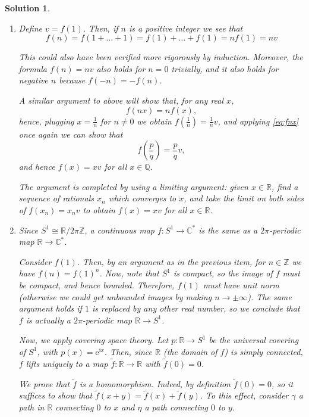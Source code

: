 \documentclass{article}
\theoremstyle{nonumberplain}
\newtheorem{sol}{Solution}
\newcommand{\R}{\mathbb{R}}
\newcommand{\C}{\mathbb{C}}
\newcommand{\Z}{\mathbb{Z}}
\newcommand{\Q}{\mathbb{Q}}
\newcommand{\I}{\mathrm{i}}
\newcommand{\e}{\mathrm{e}}
\begin{document}
\begin{sol}
\leavevmode
\begin{enumerate}
\item Define $v = f(1)$. Then, if $n$ is a positive integer we see that
\begin{equation}
f(n) = f(1+\dots+1) = f(1)+\dots+f(1) = n f(1) = nv
\end{equation}

This could also have been verified more rigorously by induction. Moreover, the formula $f(n) = nv$ also holds for $n = 0$ trivially, and it also holds for negative $n$ because $f(-n) = -f(n)$.

A similar argument to above will show that, for any real $x$,
\begin{equation}\label{eq:fnx}
f(nx) = n f(x),
\end{equation}
hence, plugging $x = \frac1n$ for $n \neq 0$ we obtain $f(\frac1n) = \frac1n v$, and applying \eqref{eq:fnx} once again we can show that
\begin{equation}
f(\frac pq) = \frac pq v,
\end{equation}
and hence $f(x) = x v$ for all $x \in \Q$.

The argument is completed by using a limiting argument: given $x \in \R$, find a sequence of rationals $x_n$ which converges to $x$, and take the limit on both sides of $f(x_n) = x_n v$ to obtain $f(x) = x v$ for all $x \in \R$.

\item Since $S^1 \cong \R / 2\pi\Z$, a continuous map $f \colon S^1 \to \C^*$ is the same as a $2\pi$-periodic map $\R \to \C^*$.

Consider $f(1)$. Then, by an argument as in the previous item, for $n \in \Z$ we have $f(n) = f(1)^n$. Now, note that $S^1$ is compact, so the image of $f$ must be compact, and hence bounded. Therefore, $f(1)$ must have unit norm (otherwise we could get unbounded images by making $n \to \pm \infty$). The same argument holds if $1$ is replaced by any other real number, so we conclude that $f$ is actually a $2\pi$-periodic map $\R \to S^1$.

Now, we apply covering space theory. Let $p \colon \R \to S^1$ be the universal covering of $S^1$, with $p(x) = \e^{\I x}$. Then, since $\R$ (the domain of $f$) is simply connected, $f$ lifts uniquely to a map $\tilde f \colon \R \to \R$ with $\tilde f(0) = 0$.

We prove that $\tilde f$ is a homomorphism. Indeed, by definition $\tilde f(0) = 0$, so it suffices to show that $\tilde f(x+y) = \tilde f(x) + \tilde f(y)$. To this effect, consider $\gamma$ a path in $\R$ connecting $0$ to $x$ and $\eta$ a path connecting $0$ to $y$.


\end{enumerate}
\end{sol}
\end{document}
